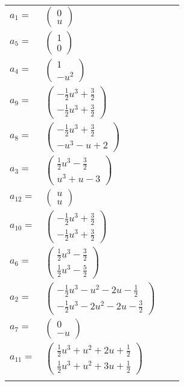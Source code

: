 \documentclass[1p]{elsarticle_modified}
\theoremstyle{definition}
\begin{document}
\begin{tabular}{m{7pt} m{180pt} m{7pt} m{180pt} }
\flushright $a_{1}=$&$\begin{pmatrix}0\\u\end{pmatrix}$ \\
\flushright $a_{5}=$&$\begin{pmatrix}1\\0\end{pmatrix}$ \\
\flushright $a_{4}=$&$\begin{pmatrix}1\\- u^2\end{pmatrix}$ \\
\flushright $a_{9}=$&$\begin{pmatrix}-\frac{1}{2} u^3+\frac{3}{2}\\-\frac{1}{2} u^3+\frac{3}{2}\end{pmatrix}$ \\
\flushright $a_{8}=$&$\begin{pmatrix}-\frac{1}{2} u^3+\frac{3}{2}\\- u^3- u+2\end{pmatrix}$ \\
\flushright $a_{3}=$&$\begin{pmatrix}\frac{1}{2} u^3-\frac{3}{2}\\u^3+u-3\end{pmatrix}$ \\
\flushright $a_{12}=$&$\begin{pmatrix}u\\u\end{pmatrix}$ \\
\flushright $a_{10}=$&$\begin{pmatrix}-\frac{1}{2} u^3+\frac{3}{2}\\-\frac{1}{2} u^3+\frac{3}{2}\end{pmatrix}$ \\
\flushright $a_{6}=$&$\begin{pmatrix}\frac{1}{2} u^3-\frac{3}{2}\\\frac{1}{2} u^3-\frac{5}{2}\end{pmatrix}$ \\
\flushright $a_{2}=$&$\begin{pmatrix}-\frac{1}{2} u^3- u^2-2 u-\frac{1}{2}\\-\frac{1}{2} u^3-2 u^2-2 u-\frac{3}{2}\end{pmatrix}$ \\
\flushright $a_{7}=$&$\begin{pmatrix}0\\- u\end{pmatrix}$ \\
\flushright $a_{11}=$&$\begin{pmatrix}\frac{1}{2} u^3+u^2+2 u+\frac{1}{2}\\\frac{1}{2} u^3+u^2+3 u+\frac{1}{2}\end{pmatrix}$\\&\end{tabular}
\end{document}
